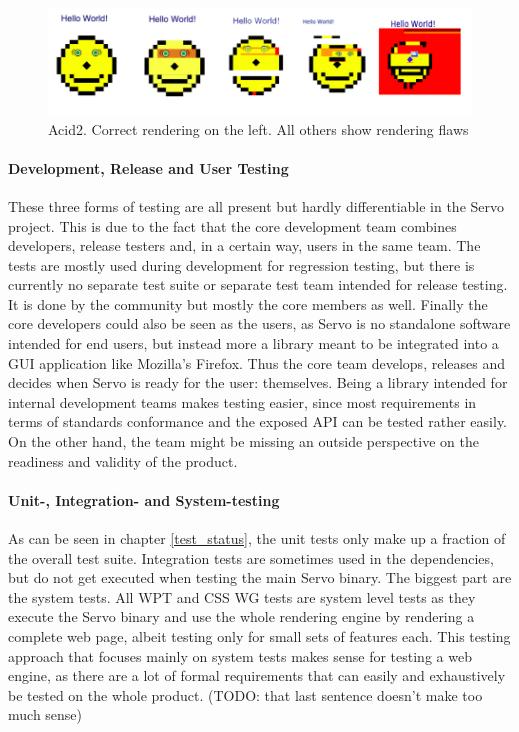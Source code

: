 \documentclass{scrartcl}
\newcommand{\todo}[1] {{\color{red}(TODO: #1)}}
\begin{document}
\begin{figure}[h]
    \centering
    \includegraphics[width=\textwidth]{acid2}
    \caption{Acid2. Correct rendering on the left. All others show rendering flaws}
\end{figure}

\paragraph{Development, Release and User Testing}
These three forms of testing are all present but hardly differentiable in the Servo project. This is due to the fact that the core development team combines developers, release testers and, in a certain way, users in the same team. The tests are mostly used during development for regression testing, but there is currently no separate test suite or separate test team intended for release testing. It is done by the community but mostly the core members as well. Finally the core developers could also be seen as the users, as Servo is no standalone software intended for end users, but instead more a library meant to be integrated into a GUI application like Mozilla's Firefox. Thus the core team develops, releases and decides when Servo is ready for the user: themselves. Being a library intended for internal development teams makes testing easier, since most requirements in terms of standards conformance and the exposed API can be tested rather easily. On the other hand, the team might be missing an outside perspective on the readiness and validity of the product.

\paragraph{Unit-, Integration- and System-testing}
As can be seen in chapter \ref{test_status}, the unit tests only make up a fraction of the overall test suite. Integration tests are sometimes used in the dependencies, but do not get executed when testing the main Servo binary. The biggest part are the system tests. All WPT and CSS WG tests are system level tests as they execute the Servo binary and use the whole rendering engine by rendering a complete web page, albeit testing only for small sets of features each. This testing approach that focuses mainly on system tests makes sense for testing a web engine, as there are a lot of formal requirements that can easily and exhaustively be tested on the whole product. \todo{that last sentence doesn't make too much sense}
\end{document}
